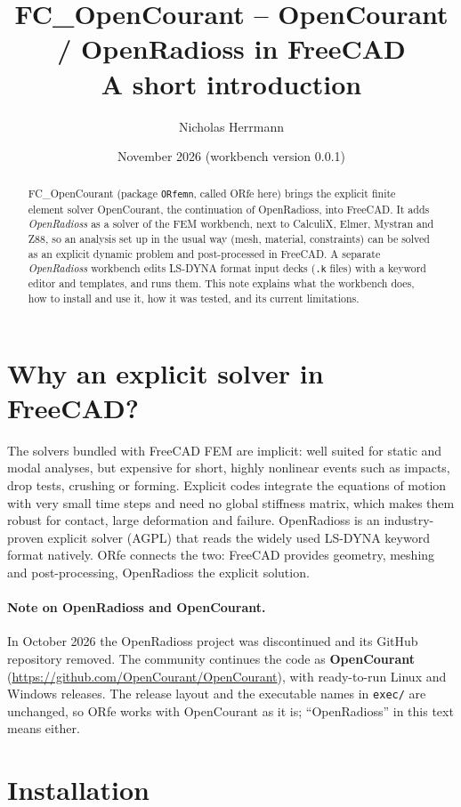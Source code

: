 \documentclass[11pt,a4paper]{article}
\title{FC\_OpenCourant -- OpenCourant / OpenRadioss in FreeCAD\\[4pt]
       \large A short introduction}
\author{Nicholas Herrmann}
\date{November 2026 \quad (workbench version 0.0.1)}
\begin{document}
\maketitle

\begin{abstract}
\noindent FC\_OpenCourant (package \texttt{ORfemn}, called ORfe here) brings the explicit finite
element solver OpenCourant, the continuation of OpenRadioss, into FreeCAD. It adds
\emph{OpenRadioss} as a solver of the FEM workbench, next to CalculiX, Elmer, Mystran and Z88,
so an analysis set up in the usual way (mesh, material, constraints) can be solved as an explicit
dynamic problem and post-processed in FreeCAD. A separate \emph{OpenRadioss} workbench edits
LS-DYNA format input decks (\texttt{.k} files) with a keyword editor and templates, and runs them.
This note explains what the workbench does, how to install and use it, how it was tested, and its
current limitations.
\end{abstract}

\section{Why an explicit solver in FreeCAD?}

The solvers bundled with FreeCAD FEM are implicit: well suited for static and modal analyses, but
expensive for short, highly nonlinear events such as impacts, drop tests, crushing or forming.
Explicit codes integrate the equations of motion with very small time steps and need no global
stiffness matrix, which makes them robust for contact, large deformation and failure. OpenRadioss
is an industry-proven explicit solver (AGPL) that reads the widely used LS-DYNA keyword format
natively. ORfe connects the two: FreeCAD provides geometry, meshing and post-processing,
OpenRadioss the explicit solution.

\paragraph{Note on OpenRadioss and OpenCourant.}
In October 2026 the OpenRadioss project was discontinued and its GitHub repository removed. The
community continues the code as \textbf{OpenCourant}
(\url{https://github.com/OpenCourant/OpenCourant}), with ready-to-run Linux and Windows
releases. The release layout and the executable names in \texttt{exec/} are unchanged, so ORfe
works with OpenCourant as it is; ``OpenRadioss'' in this text means either.

\section{Installation}
\end{document}
